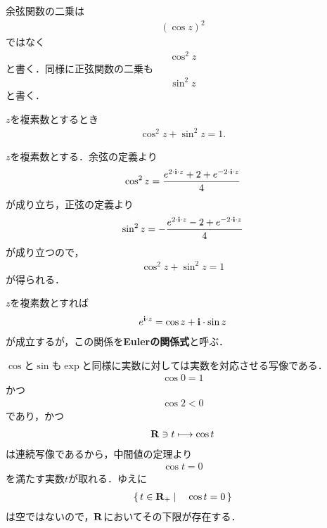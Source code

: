 	余弦関数の二乗は
	\begin{align}
		(\cos{z})^2
	\end{align}
	ではなく
	\begin{align}
		\cos^2{z}
	\end{align}
	と書く．同様に正弦関数の二乗も
	\begin{align}
		\sin^2{z}
	\end{align}
	と書く．
	
	\begin{screen}
		\begin{thm}[余弦と正弦の二乗和は$1$]
			$z$を複素数とするとき
			\begin{align}
				\cos^2{z} + \sin^2{z} = 1.
			\end{align}
		\end{thm}
	\end{screen}
	
	\begin{sketch}
		$z$を複素数とする．余弦の定義より
		\begin{align}
			\cos^2{z} = \frac{e^{2 \cdot \mathbf{i} \cdot z} + 2 + e^{-2 \cdot \mathbf{i} \cdot z}}{4}
		\end{align}
		が成り立ち，正弦の定義より
		\begin{align}
			\sin^2{z} = -\frac{e^{2 \cdot \mathbf{i} \cdot z} - 2 + e^{-2 \cdot \mathbf{i} \cdot z}}{4}
		\end{align}
		が成り立つので，
		\begin{align}
			\cos^2{z} + \sin^2{z} = 1
		\end{align}
		が得られる．
		\QED
	\end{sketch}
	
	\begin{screen}
		\begin{thm}
		\label{thm:derivatives_of_trigonometric_functions}
		\end{thm}
	\end{screen}
	
	$z$を複素数とすれば
	\begin{align}
		e^{\mathbf{i} \cdot z} = \cos{z} + \mathbf{i} \cdot \sin{z}
	\end{align}
	が成立するが，この関係を{\bf Eulerの関係式}と呼ぶ．
	
	$\cos$と$\sin$も$\exp$と同様に実数に対しては実数を対応させる写像である．
	\begin{align}
		\cos{0} = 1
	\end{align}
	かつ
	\begin{align}
		\cos{2} < 0
	\end{align}
	であり，かつ
	\begin{align}
		\mathbf{R} \ni t \longmapsto \cos{t}
	\end{align}
	は連続写像であるから，中間値の定理より
	\begin{align}
		\cos{t} = 0
	\end{align}
	を満たす実数$t$が取れる．ゆえに
	\begin{align}
		\left\{\, t \in \mathbf{R}_+ \mid \quad \cos{t} = 0\, \right\}
	\end{align}
	は空ではないので，$\mathbf{R}$においてその下限が存在する．
	
